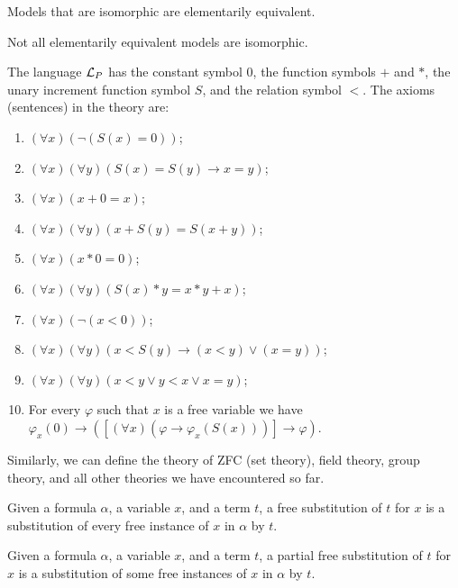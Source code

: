 \documentclass[11pt,a4paper]{article}
\renewcommand{\implies}{\rightarrow}
\begin{document}
\begin{proposition}
  Models that are isomorphic are elementarily equivalent.
\end{proposition}
\begin{remark}
  Not all elementarily equivalent models are isomorphic.
\end{remark}

\begin{example}
  The language $\mathcal{L}_P$ has the constant symbol $0$, the function symbols
  $+$ and $*$, the unary increment function symbol $S$, and the relation
  symbol $<$. The axioms (sentences) in the theory are:
  \begin{enumerate}
    \item [(1)] $(\forall x)(\neg (S(x) = 0))$;
    \item [(2)] $(\forall x)(\forall y)(S(x) = S(y) \implies x =y)$;
    \item [(3)] $(\forall x)(x + 0 = x)$;
    \item [(4)] $(\forall x)(\forall y)(x + S(y) = S(x + y))$;
    \item [(5)] $(\forall x)(x * 0 = 0)$;
    \item [(6)] $(\forall x)(\forall y)(S(x) * y = x * y + x)$;
    \item [(7)] $(\forall x)(\neg (x < 0))$;
    \item [(8)] $(\forall x)(\forall y)
      (x < S(y) \implies (x < y) \lor (x=y))$;
    \item [(9)] $(\forall x)(\forall y)(x < y \lor y < x \lor x = y)$;
    \item [(10)] For every $\varphi$ such that $x$ is a free variable 
      we have $\varphi_x(0) \implies \left(\left[(\forall x)
      (\varphi \implies \varphi_x(S(x)))\right] \implies \varphi \right)$.
  \end{enumerate}
\end{example}

Similarly, we can define the theory of ZFC (set theory), field theory,
group theory, and all other theories we have encountered so far.

\begin{definition}
  Given a formula $\alpha$, a variable $x$, and a term $t$,
  a free substitution of $t$ for $x$ is a substitution of every
  free instance of $x$ in $\alpha$ by $t$.
\end{definition}

\begin{definition}
  Given a formula $\alpha$, a variable $x$, and a term $t$,
  a partial free substitution of $t$ for $x$ is a substitution of some
  free instances of $x$ in $\alpha$ by $t$.
\end{definition}
\end{document}
